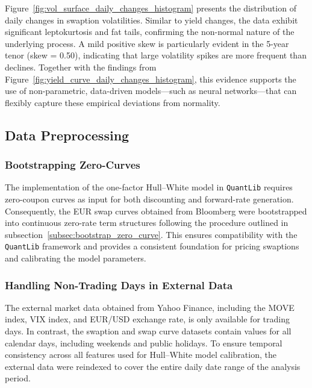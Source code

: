 Figure~\ref{fig:vol_surface_daily_changes_histogram} presents the distribution of daily changes in swaption volatilities. Similar to yield changes, the data exhibit significant leptokurtosis and fat tails, confirming the non-normal nature of the underlying process. A mild positive skew is particularly evident in the 5-year tenor (skew = 0.50), indicating that large volatility spikes are more frequent than declines. Together with the findings from Figure~\ref{fig:yield_curve_daily_changes_histogram}, this evidence supports the use of non-parametric, data-driven models—such as neural networks—that can flexibly capture these empirical deviations from normality.

\subsection{Data Preprocessing}
\subsubsection{Bootstrapping Zero-Curves}
The implementation of the one-factor Hull–White model in \texttt{QuantLib} requires zero-coupon curves as input for both discounting and forward-rate generation. Consequently, the EUR swap curves obtained from Bloomberg were bootstrapped into continuous zero-rate term structures following the procedure outlined in subsection~\ref{subsec:bootstrap_zero_curve}. This ensures compatibility with the \texttt{QuantLib} framework and provides a consistent foundation for pricing swaptions and calibrating the model parameters.

\subsubsection{Handling Non-Trading Days in External Data}
The external market data obtained from Yahoo Finance, including the MOVE index, VIX index, and EUR/USD exchange rate, is only available for trading days. In contrast, the swaption and swap curve datasets contain values for all calendar days, including weekends and public holidays. To ensure temporal consistency across all features used for Hull–White model calibration, the external data were reindexed to cover the entire daily date range of the analysis period.

